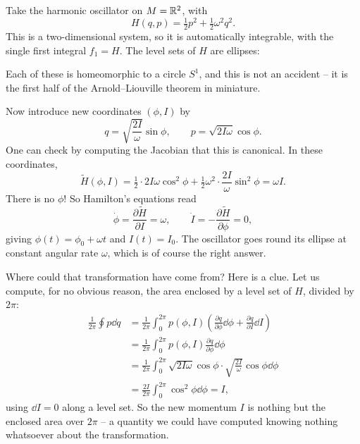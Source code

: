 \documentclass[a4paper]{scrartcl}
\begin{document}
\begin{example}
	Take the harmonic oscillator on $M = \mathbb{R}^2$, with
	$$
	H(q,p) = \tfrac{1}{2}p^2 + \tfrac{1}{2}\omega^2 q^2.
	$$
	This is a two-dimensional system, so it is automatically integrable, with the single first integral $f_1 = H$. The level sets of $H$ are ellipses:
	\begin{center}
	\end{center}
	Each of these is homeomorphic to a circle $S^1$, and this is not an accident -- it is the first half of the Arnold--Liouville theorem in miniature.

	Now introduce new coordinates $(\phi, I)$ by
	$$
	q = \sqrt{\frac{2I}{\omega}}\sin\phi, \qquad p = \sqrt{2I\omega}\cos\phi.
	$$
	One can check by computing the Jacobian that this is canonical. In these coordinates,
	$$
	\tilde H(\phi, I) = \tfrac{1}{2}\cdot 2I\omega\cos^2\phi + \tfrac{1}{2}\omega^2\cdot\frac{2I}{\omega}\sin^2\phi = \omega I.
	$$
	There is no $\phi$! So Hamilton's equations read
	$$
	\dot\phi = \frac{\partial \tilde H}{\partial I} = \omega, \qquad \dot I = -\frac{\partial \tilde H}{\partial\phi} = 0,
	$$
	giving $\phi(t) = \phi_0 + \omega t$ and $I(t) = I_0$. The oscillator goes round its ellipse at constant angular rate $\omega$, which is of course the right answer.

	Where could that transformation have come from? Here is a clue. Let us compute, for no obvious reason, the area enclosed by a level set of $H$, divided by $2\pi$:
	\begin{align*}
		\frac{1}{2\pi}\oint p \dd q &= \frac{1}{2\pi}\int_0^{2\pi} p(\phi, I)\left(\frac{\partial q}{\partial\phi}\dd\phi + \frac{\partial q}{\partial I}\dd I\right)\\
		&= \frac{1}{2\pi}\int_0^{2\pi}p(\phi,I)\frac{\partial q}{\partial \phi}\dd\phi\\
		&= \frac{1}{2\pi}\int_0^{2\pi}\sqrt{2I\omega}\cos\phi\cdot\sqrt{\frac{2I}{\omega}}\cos\phi \dd\phi\\
		&= \frac{2I}{2\pi}\int_0^{2\pi}\cos^2\phi \dd\phi = I,
	\end{align*}
	using $\dd I = 0$ along a level set. So the new momentum $I$ is nothing but the enclosed area over $2\pi$ -- a quantity we could have computed knowing nothing whatsoever about the transformation.
\end{example}
\end{document}
